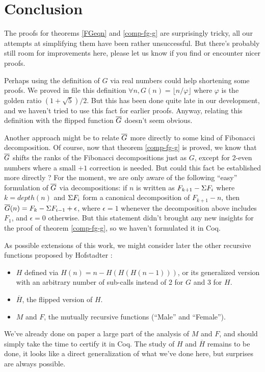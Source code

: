 \documentclass[a4paper,11pt]{article}
\begin{document}
\section{Conclusion}

The proofs for theorems \ref{FGeqn} and \ref{comp-fg-g} are
surprisingly tricky, all our attempts at simplifying them
have been rather unsuccessful. But there's probably still room
for improvements here, please let us know if you find or
encounter nicer proofs.

Perhaps using the definition of $G$
via real numbers could help shortening some proofs.
We proved in file  this definition
$\forall n, G(n)=\lfloor n/\varphi\rfloor$ where $\varphi$
is the golden ratio $(1+\sqrt{5})/2$. But this has been done
quite late in our development, and we haven't tried to use this
fact for earlier proofs. Anyway,
relating this definition with the flipped function $\overline{G}$
doesn't seem obvious.

Another approach might be to relate
$\overline{G}$ more directly to some kind of Fibonacci decomposition.
Of course, now that theorem \ref{comp-fg-g} is proved, we
know that $\overline{G}$ shifts the ranks of the Fibonacci decompositions
just as $G$, except for 2-even numbers where a small $+1$
correction is needed. But could this fact be established more
directly ? For the moment, we are only aware of the following
``easy'' formulation of $\overline{G}$ via decompositions:
if $n$ is written as $F_{k+1}-\Sigma F_i$ where $k=depth(n)$
and $\Sigma F_i$ form a canonical decomposition of $F_{k+1}-n$, then
$\overline{G}(n)=F_k-\Sigma F_{i-1}+\epsilon$, where $\epsilon=1$ whenever
the decomposition above includes $F_1$, and $\epsilon=0$
otherwise. But this statement didn't brought any new insights
for the proof of theorem \ref{comp-fg-g}, so we haven't formulated
it in Coq.

As possible extensions of this work, we might consider later
the other recursive functions proposed by Hofstadter :
\begin{itemize}
\item $H$ defined via $H(n)=n-H(H(H(n-1)))$, or its generalized
   version with an arbitrary number of sub-calls instead of 2
   for $G$ and 3 for $H$.
\item $\overline{H}$, the flipped version of $H$.
\item $M$ and $F$, the mutually recursive functions (``Male''
and ``Female'').
\end{itemize}
We've already done on paper a large part of the analysis of
$M$ and $F$, and should simply take the time to certify
it in Coq. The study of $H$ and $\overline{H}$ remains to be
done, it looks like a direct generalization of what we've
done here, but surprises are always possible.
\end{document}
